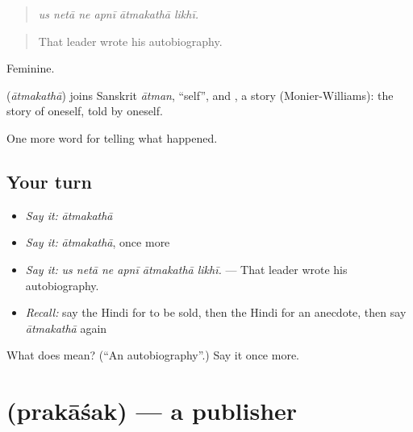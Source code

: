 \begin{quote}
     
\end{quote}

\begin{quote}
\emph{us netā ne apnī ātmakathā likhī.}
\end{quote}

\begin{quote}
That leader wrote his autobiography.
\end{quote}

Feminine.

\begin{cousinweb}
\textbf{} (\emph{ātmakathā}) joins Sanskrit \emph{ātman}, \textquotedblleft{}self\textquotedblright{}, and \textbf{}, a story (Monier-Williams): the story of oneself, told by oneself.
\end{cousinweb}

\begin{grammarlens}[title={What you've built}]
One more word for telling what happened.
\end{grammarlens}

\subsection*{Your turn}
\begin{itemize}
\raggedright
  \item \emph{Say it:} \emph{ātmakathā}
  \item \emph{Say it:} \emph{ātmakathā}, once more
  \item \emph{Say it:} \emph{us netā ne apnī ātmakathā likhī.} — That leader wrote his autobiography.
  \item \emph{Recall:} say the Hindi for to be sold, then the Hindi for an anecdote, then say \emph{ātmakathā} again
\end{itemize}

\begin{tcolorbox}[breakable,colback=teal!4,colframe=teal!35!black,title={Before you move on}]
What does  mean? (\textquotedblleft{}An autobiography\textquotedblright{}.) Say it once more.
\end{tcolorbox}
\section[\texorpdfstring{\hi{प्रकाशक} (prakāśak)}{प्रकाशक (prakāśak)}]{ (prakāśak) — a publisher}

